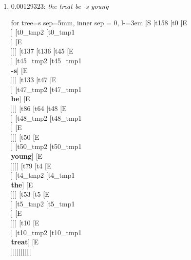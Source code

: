 \documentclass[11pt]{article}
\begin{document}
\begin{enumerate}
	\item  0.00129323: \textit{the treat be -s young} \\[0.5em]
	\begin{forest}
	for tree={s sep=5mm, inner sep = 0, l-=3em}
	[S [t158 [t0 [E\\ ] [t0_tmp2 [t0_tmp1\\ ] [E\\ ]]] [t137 [t136 [t45 [E\\ ] [t45_tmp2 [t45_tmp1\\\textbf{-s}] [E\\ ]]] [t133 [t47 [E\\ ] [t47_tmp2 [t47_tmp1\\\textbf{be}] [E\\ ]]] [t86 [t64 [t48 [E\\ ] [t48_tmp2 [t48_tmp1\\ ] [E\\ ]]] [t50 [E\\ ] [t50_tmp2 [t50_tmp1\\\textbf{young}] [E\\ ]]]] [t79 [t4 [E\\ ] [t4_tmp2 [t4_tmp1\\\textbf{the}] [E\\ ]]] [t53 [t5 [E\\ ] [t5_tmp2 [t5_tmp1\\ ] [E\\ ]]] [t10 [E\\ ] [t10_tmp2 [t10_tmp1\\\textbf{treat}] [E\\ ]]]]]]]]]]]
	\end{forest}
	\newpage


\end{enumerate}
\end{document}
